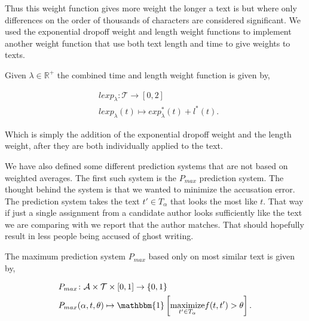 Thus this weight function gives more weight the longer a text is but where only
differences on the order of thousands of characters are considered significant.
We used the exponential dropoff weight and length weight functions to implement
another weight function that use both text length and time to give weights to
texts.

\begin{definition}

    Given $\lambda \in \mathbb{R}^+$ the combined time and length weight
    function is given by,

    \begin{align}
        &lexp_\lambda \colon \mathcal{T} \rightarrow [0, 2] \\
        &lexp_\lambda(t) \mapsto exp^*_\lambda(t) + l^*(t).
    \end{align}

\end{definition}

Which is simply the addition of the exponential dropoff weight and the length
weight, after they are both individually applied to the text.

We have also defined some different prediction systems that are not based on
weighted averages. The first such system is the $P_{max}$ prediction system.
The thought behind the system is that we wanted to minimize the accusation
error. The prediction system takes the text $t' \in T_\alpha$ that looks the
most like $t$. That way if just a single assignment from a candidate author
looks sufficiently like the text we are comparing with we report that the author
matches. That should hopefully result in less people being accused of ghost
writing.

\begin{definition}
    \label{def:maximum_prediction_system}

    The maximum prediction system $P_{max}$ based only on most similar text is
    given by,

    \begin{align}
        &P_{max} \colon \mathcal{A} \times \mathcal{T} \times [0, 1] \rightarrow
            \{0, 1\} \\
        &P_{max}(\alpha, t, \theta) \mapsto \mathbbm{1}\left[
                \underset{t' \in T_\alpha}{\text{maximize}} f(t, t') > \theta
            \right].
    \end{align}

\end{definition}

